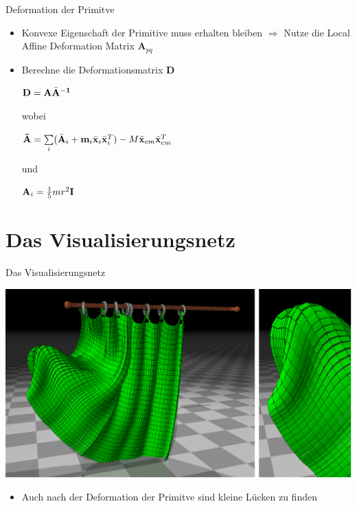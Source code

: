 \documentclass[t]{beamer}
\begin{document}
	\begin{frame}{Deformation der Primitve}
		\begin{itemize}
			\item Konvexe Eigenschaft der Primitive muss erhalten bleiben
					$\Rightarrow$ Nutze die Local Affine Deformation Matrix $\mathbf{A}_{pq}$
			\item Berechne die Deformationsmatrix \textbf{D}
				\begin{center}
					$\mathnormal{\mathbf{D}}=\mathnormal{\mathbf{A \bar{A}^{-1}}}$
				\end{center} wobei
				\begin{center}
					$\mathbf{\bar{A}}=\sum\limits_{i}(\mathnormal{\mathbf{\bar{A}}_i+\mathbf{m}_i\mathbf{\bar{x}}_i\mathbf{\bar{x}}_i^T})-M\mathnormal{\mathbf{\bar{x}}_{cm} \mathbf{\bar{x}}_{cm}^T}$
				\end{center} und 
				\begin{center}
					$\mathnormal{\mathbf{A}_{i}}=\frac{1}{5}mr^2\mathbf{I}$
				\end{center}
		\end{itemize}
	\end{frame}
	
	\section{Das Visualisierungsnetz}
	\begin{frame}{Das Visualisierungsnetz}
		\begin{center}
			\includegraphics[scale = 0.275]{Curtain_2.png}
		\end{center}
		\begin{itemize}
			\item Auch nach der Deformation der Primitve sind kleine Lücken zu finden
		\end{itemize}
	\end{frame}
	
\end{document}
